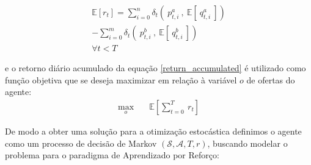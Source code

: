 \begin{equation}
	\begin{aligned}
		\mathbb{E} [r_{t}] = 
		\sum_{i = 0}^{n} \delta_{t}(\ p_{t, i}^{a}\ ,\ \mathbb{E} [\ q_{t, i}^{a}\ ]) \\
		-\sum_{i = 0}^{m} \delta_{t}(\ p_{t, i}^{b}\ ,\ \mathbb{E} [\ q_{t, i}^{b}\ ]) \\
		\forall t < T
	\end{aligned}
\end{equation}

e o retorno diário acumulado da equação \ref{return_accumulated} é utilizado como função objetiva que se deseja maximizar em relação à variável $o$ de ofertas do agente:
\begin{equation} \label{objective_equation}
	\begin{aligned}
		\max_{o} \quad & \mathbb{E} [\sum_{t=0}^{T} \ r_{t}]
	\end{aligned}
\end{equation}

De modo a obter uma solução para a otimização estocástica definimos o agente como um processo de decisão de Markov $(\mathcal{S}, \mathcal{A}, T, r)$, buscando modelar o problema para o paradigma de Aprendizado por Reforço:

